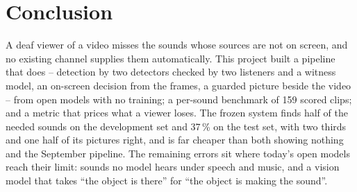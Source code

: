 \section{Conclusion}\label{sec:conclusion}

A deaf viewer of a video misses the sounds whose sources are not on screen, and no existing channel supplies them
automatically. This project built a pipeline that does -- detection by two detectors checked by two listeners and a
witness model, an on-screen decision from the frames, a guarded picture beside the video -- from open models with no
training; a per-sound benchmark of 159 scored clips; and a metric that prices what a viewer loses. The frozen system
finds half of the needed sounds on the development set and 37\,\% on the test set, with two thirds and one half of its
pictures right, and is far cheaper than both showing nothing and the September pipeline. The remaining errors sit
where today's open models reach their limit: sounds no model hears under speech and music, and a vision model that
takes ``the object is there'' for ``the object is making the sound''.

